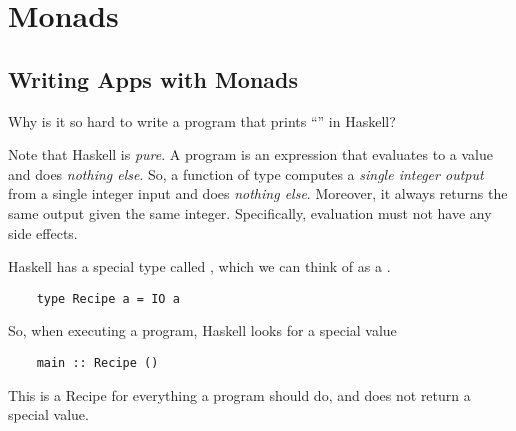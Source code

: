 \documentclass[letterpaper]{article}
\begin{document}
\section{Monads}
\subsection{Writing Apps with Monads}
Why is it so hard to write a program that prints ``'' in Haskell?

\bigskip 

Note that Haskell is \emph{pure}. A program is an expression that evaluates to a value and does \emph{nothing else}. So, a function of type  computes a \emph{single integer output} from a single integer input and does \emph{nothing else}. Moreover, it always returns the same output given the same integer. Specifically, evaluation must not have any side effects. 

\bigskip 

Haskell has a special type called , which we can think of as a .
\begin{verbatim}
    type Recipe a = IO a \end{verbatim}

So, when executing a program, Haskell looks for a special value 
\begin{verbatim}
    main :: Recipe ()\end{verbatim}
This is a Recipe for everything a program should do, and does not return a special value.

\bigskip 
\end{document}
